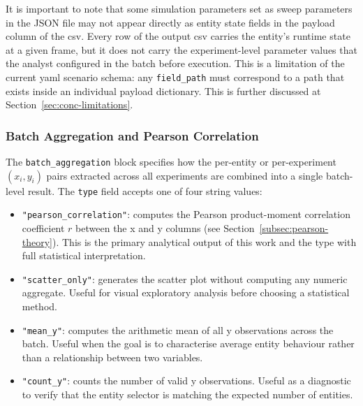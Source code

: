 It is important to note that some simulation parameters set as sweep parameters in the JSON
file may not appear directly as entity state fields in the payload column of the \gls{csv}.
Every row of the output \gls{csv} carries the entity's runtime state at a given frame,
but it does not carry the experiment-level parameter values that the analyst configured
in the batch before execution. This is a limitation of the current \gls{yaml}
scenario schema: any \texttt{field\_path} must correspond to a path that exists inside an
individual payload dictionary. This is further discussed at Section~\ref{sec:conc-limitations}.

\subsubsection{Batch Aggregation and Pearson Correlation}
\label{subsec:batch-agg}

The \texttt{batch\_aggregation} block specifies how the per-entity or per-experiment
\((x_i, y_i)\) pairs extracted across all experiments are combined into a single batch-level
result.  The \texttt{type} field accepts one of four string values:

\begin{itemize}
    \item \texttt{"pearson\_correlation"}: computes the Pearson product-moment correlation
          coefficient $r$ between the x and y columns (see Section~\ref{subsec:pearson-theory}).
          This is the primary analytical output of this work and the type with full
          statistical interpretation.
    \item \texttt{"scatter\_only"}: generates the scatter plot without computing any numeric
          aggregate.  Useful for visual exploratory analysis before choosing a statistical method.
    \item \texttt{"mean\_y"}: computes the arithmetic mean of all y observations across the batch.
          Useful when the goal is to characterise average entity behaviour rather than a
          relationship between two variables.
    \item \texttt{"count\_y"}: counts the number of valid y observations.  Useful as a diagnostic
          to verify that the entity selector is matching the expected number of entities.
\end{itemize}

